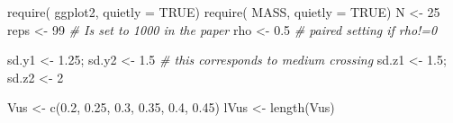 \documentclass[
]{article}
\newenvironment{Shaded}{\begin{snugshade}}{\end{snugshade}}
\newcommand{\AttributeTok}[1]{\textcolor[rgb]{0.77,0.63,0.00}{#1}}
\newcommand{\CommentTok}[1]{\textcolor[rgb]{0.56,0.35,0.01}{\textit{#1}}}
\newcommand{\ConstantTok}[1]{\textcolor[rgb]{0.00,0.00,0.00}{#1}}
\newcommand{\DecValTok}[1]{\textcolor[rgb]{0.00,0.00,0.81}{#1}}
\newcommand{\FloatTok}[1]{\textcolor[rgb]{0.00,0.00,0.81}{#1}}
\newcommand{\FunctionTok}[1]{\textcolor[rgb]{0.00,0.00,0.00}{#1}}
\newcommand{\NormalTok}[1]{#1}
\newcommand{\OtherTok}[1]{\textcolor[rgb]{0.56,0.35,0.01}{#1}}
\begin{document}
\begin{Shaded}
\begin{Highlighting}[]
\FunctionTok{require}\NormalTok{( ggplot2, }\AttributeTok{quietly =} \ConstantTok{TRUE}\NormalTok{)}
\FunctionTok{require}\NormalTok{( MASS, }\AttributeTok{quietly =} \ConstantTok{TRUE}\NormalTok{)}
\NormalTok{N }\OtherTok{\textless{}{-}} \DecValTok{25}
\NormalTok{reps }\OtherTok{\textless{}{-}} \DecValTok{99}                    \CommentTok{\# Is set to 1000 in the paper}
\NormalTok{rho }\OtherTok{\textless{}{-}} \FloatTok{0.5}                    \CommentTok{\# paired setting if rho!=0}

\NormalTok{sd.y1 }\OtherTok{\textless{}{-}} \FloatTok{1.25}\NormalTok{;  sd.y2 }\OtherTok{\textless{}{-}} \FloatTok{1.5}  \CommentTok{\# this corresponds to medium crossing}
\NormalTok{sd.z1 }\OtherTok{\textless{}{-}} \FloatTok{1.5}\NormalTok{;   sd.z2 }\OtherTok{\textless{}{-}} \DecValTok{2}

\NormalTok{Vus }\OtherTok{\textless{}{-}} \FunctionTok{c}\NormalTok{(}\FloatTok{0.2}\NormalTok{, }\FloatTok{0.25}\NormalTok{, }\FloatTok{0.3}\NormalTok{, }\FloatTok{0.35}\NormalTok{, }\FloatTok{0.4}\NormalTok{, }\FloatTok{0.45}\NormalTok{)}
\NormalTok{lVus }\OtherTok{\textless{}{-}} \FunctionTok{length}\NormalTok{(Vus)}


\end{Highlighting}
\end{Shaded}
\end{document}
